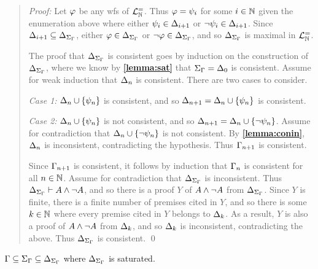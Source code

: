 \begin{quote} 
  \textit{Proof:} 
  Let $\varphi$ be any wfs of $\mathcal{L}^{=}_{\mathbb{N}}$.
  Thus $\varphi=\psi_i$ for some $i\in\mathbb{N}$ given the enumeration above where either $\psi_i\in\Delta_{i+1}$ or $\neg\psi_i\in\Delta_{i+1}$.
  Since $\Delta_{i+1}\subseteq\Delta_{\Sigma_{\Gamma}}$, either $\varphi\in\Delta_{\Sigma_{\Gamma}}$ or $\neg\varphi\in\Delta_{\Sigma_{\Gamma}}$, and so $\Delta_{\Sigma_{\Gamma}}$ is maximal in $\mathcal{L}^{=}_{\mathbb{N}}$.

  The proof that $\Delta_{\Sigma_{\Gamma}}$ is consistent goes by induction on the construction of $\Delta_{\Sigma_{\Gamma}}$, where we know by \textbf{\ref{lemma:sat}} that $\Sigma_{\Gamma}=\Delta_0$ is consistent. 
  Assume for weak induction that $\Delta_n$ is consistent. 
  There are two cases to consider.

  \textit{Case 1:} $\Delta_n\cup\lbrace\psi_n\rbrace$ is consistent, and so $\Delta_{n+1}=\Delta_n\cup\lbrace\psi_n\rbrace$ is consistent. 

  \textit{Case 2:} $\Delta_n\cup\lbrace\psi_n\rbrace$ is not consistent, and so $\Delta_{n+1}=\Delta_n\cup\lbrace\neg\psi_n\rbrace$. 
  Assume for contradiction that $\Delta_n\cup\lbrace\neg\psi_n\rbrace$ is not consistent. 
  By \textbf{\ref{lemma:conin}}, $\Delta_n$ is inconsistent, contradicting the hypothesis. 
  Thus $\Gamma_{n+1}$ is consistent. 

  Since $\Gamma_{n+1}$ is consistent, it follows by induction that $\Gamma_n$ is consistent for all $n\in\mathbb{N}$.
  Assume for contradiction that $\Delta_{\Sigma_{\Gamma}}$ is inconsistent.
  Thus $\Delta_{\Sigma_{\Gamma}}\vdash A\wedge\neg A$, and so there is a proof $Y$ of $A\wedge\neg A$ from $\Delta_{\Sigma_{\Gamma}}$. 
  Since $Y$ is finite, there is a finite number of premises cited in $Y$, and so there is some $k\in\mathbb{N}$ where every premise cited in $Y$ belongs to $\Delta_k$.
  As a result, $Y$ is also a proof of $A\wedge\neg A$ from $\Delta_k$, and so $\Delta_k$ is inconsistent, contradicting the above. 
  Thus $\Delta_{\Sigma_{\Gamma}}$ is consistent. 
  \qed
\end{quote}




\begin{Lthm} \label{lemma:include}
  $\Gamma\subseteq\Sigma_{\Gamma}\subseteq\Delta_{\Sigma_{\Gamma}}$ where $\Delta_{\Sigma_{\Gamma}}$ is saturated.
\end{Lthm}
 
